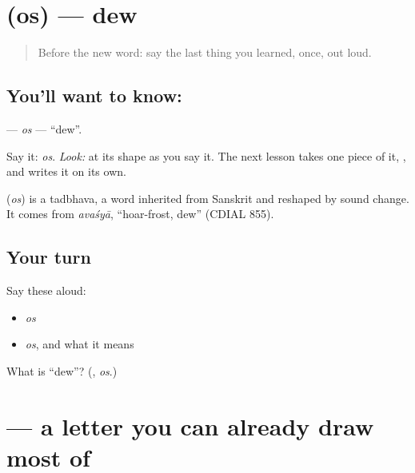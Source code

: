 \section[\texorpdfstring{\hi{ओस} (os)}{ओस (os)}]{ (os) — dew}

\label{lesson:HI-C22-os}



\begin{quote}
Before the new word: say the last thing you learned, once, out loud.
\end{quote}

\subsection*{You'll want to know: }
\textbf{} — \emph{os} — \textquotedblleft{}dew\textquotedblright{}.

Say it: \emph{os}. \emph{Look:} at its shape as you say it. The next lesson takes one piece of it, \textbf{}, and writes it on its own.

\begin{cousinweb}
\textbf{} (\emph{os}) is a tadbhava, a word inherited from Sanskrit and reshaped by sound change. It comes from \emph{avaśyā}, \textquotedblleft{}hoar-frost, dew\textquotedblright{} (CDIAL 855).
\end{cousinweb}

\subsection*{Your turn}
Say these aloud:

\begin{itemize}
\raggedright
  \item \emph{os}
  \item \emph{os}, and what it means
\end{itemize}

\begin{tcolorbox}[breakable,colback=teal!4,colframe=teal!35!black,title={Before you move on}]
What is \textquotedblleft{}dew\textquotedblright{}? (\textbf{}, \emph{os}.)
\end{tcolorbox}
\section[\texorpdfstring{\hi{ओ} (o)}{ओ (o)}]{ — a letter you can already draw most of}

\label{lesson:HI-S129-letter-o}



